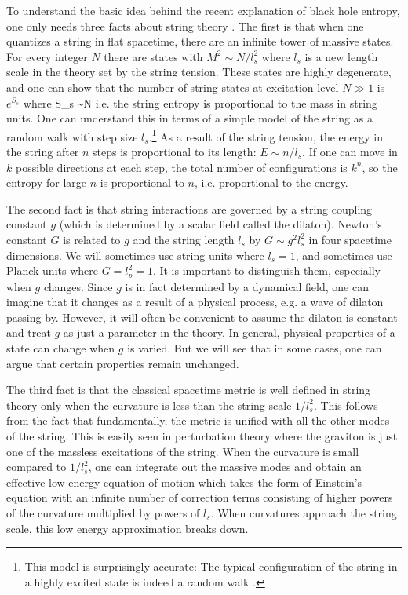 To understand the basic idea behind the recent explanation of
black hole entropy, one only needs
three facts about string theory \cite{gsw}. The first is that when one quantizes
a string in flat spacetime, there are an infinite tower of massive states.
For every integer $N$ there are states with $M^2 \sim N/l_s^2$ where $l_s$ is
a new length scale in the theory set by the string tension. These states
are highly degenerate, and one can show that
the number of string states at excitation level $N\gg 1$ is $e^{S_s}$ where
\eq
S_s \sim \sqrt N
\eqe
i.e. the string entropy is proportional to the mass in string units. One can
understand this in terms of a simple model of the string as a random walk
with step size $l_s$.\footnote{This model is surprisingly accurate: The
typical configuration of the string in a highly excited state is indeed a
random walk \cite{mitu}.} As a result of the string tension, the energy 
in the string after $n$ steps is
proportional to its length: $E\sim n/l_s$.
If one can move in $k$ possible directions at each step, the total number of
configurations is $k^n$, so the entropy for large $n$ is proportional to
$n$, i.e. proportional to the energy.

The second fact is that string interactions are governed by a string coupling
constant $g$ (which is determined by a scalar field called the dilaton).
Newton's constant $G$ is related to $g$ and the string length $l_s$
by $G \sim g^2 l_s^2$ in four spacetime dimensions. We will sometimes use
string units where $l_s=1$, and sometimes use Planck units where $G = l_p^2 =1$.
It is important to distinguish them, especially when $g$ changes.
 Since $g$ is in fact determined by a dynamical
field, one can imagine that it changes as a result of a physical process,
e.g. a wave of dilaton passing by. However, it will often be convenient
to assume the dilaton is constant and treat $g$ as just a parameter in 
the theory. In general, physical properties of a state can change
when $g$ is varied. But we will see that
in some cases, one can argue that certain 
properties remain unchanged.

The third fact is that the classical
spacetime metric
is well defined in string theory only when the curvature is less than
the string scale $1/l_s^2$. This follows from the fact that fundamentally,
the metric is
unified with all the other modes of the string. This is easily seen in
perturbation theory where the graviton is just one of the massless excitations
of the string. When the curvature is small compared to $1/l_s^2$,
one can integrate out the massive modes and obtain an effective low
energy 
equation of motion which  takes the form of Einstein's equation with an infinite
number of correction terms consisting of higher powers of the curvature
multiplied by powers of $l_s$.  When curvatures approach the string scale,
this low energy approximation breaks down.

